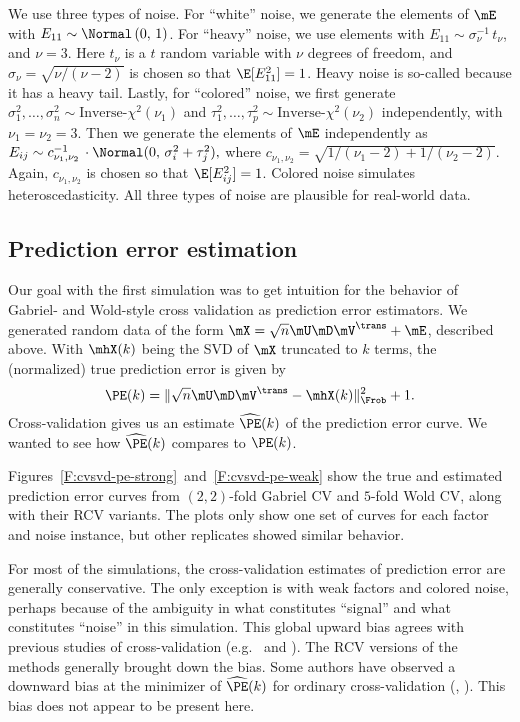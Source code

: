 We use three types of noise.  For ``white'' noise, we generate the elements of $\mE$ \iid with $E_{11} \sim \Normal\left( 0, \, 1\right)$.  For ``heavy'' noise, we use \iid elements with $E_{11} \sim \sigma_\nu^{-1} \, t_\nu$, and
$\nu = 3$.  Here $t_\nu$ is a $t$ random variable with $\nu$ degrees of freedom, and $\sigma_\nu = \sqrt{\nu/(\nu-2)}$ is chosen so that 
$\E [ E_{11}^2 ] = 1$.  Heavy noise is so-called because it has a heavy tail.  Lastly, for ``colored'' noise, we first generate
$\sigma^2_1, \ldots, \sigma^2_n \sim \text{Inverse-$\chi^2$}(\nu_1)$ and
$\tau^2_1, \ldots, \tau^2_p \sim \text{Inverse-$\chi^2$}(\nu_2)$ independently, with $\nu_1 = \nu_2 = 3$.  Then we generate the elements of $\mE$ independently as
\(
    E_{ij} \sim 
        c_{\nu_1, \nu_2}^{-1} \, \cdot \Normal( 0, \, \sigma^2_i + \tau^2_j),
\)
where
\(
    c_{\nu_1, \nu_2}
        =
        \sqrt{1/(\nu_1 - 2) + 1/(\nu_2 - 2)}
\).
Again, $c_{\nu_1, \nu_2}$ is chosen so that $\E [E_{ij}^2] = 1$.  Colored 
noise simulates heteroscedasticity.  All three types of noise are plausible 
for real-world data.


\subsection{Prediction error estimation}

Our goal with the first simulation was to get intuition for the behavior of
Gabriel- and Wold-style cross validation as prediction error estimators. We
generated random data of the form $\mX = \sqrt{n} \mU \mD \mV^\trans + \mE$,
described above. With $\mhX(k)$ being the SVD of $\mX$ truncated to $k$ terms,
the (normalized) true prediction error is given by
\[ 
    \PE(k) = \| \sqrt{n} \mU \mD \mV^\trans - \mhX(k) \|_\Frob^2 + 1. 
\] 
Cross-validation gives us an estimate $\widehat{\PE}(k)$ of the prediction 
error curve.  We wanted to see how $\widehat{\PE}(k)$ compares to $\PE(k)$.

Figures~\ref{F:cvsvd-pe-strong}~and~\ref{F:cvsvd-pe-weak} show the true and
estimated prediction error curves from $(2,2)$-fold Gabriel CV and $5$-fold
Wold CV, along with their RCV variants. The plots only show one set of curves
for each factor and noise instance, but other replicates showed similar
behavior.  

For most of the simulations, the cross-validation estimates of prediction
error are generally conservative. The only exception is with weak factors and
colored noise, perhaps because of the ambiguity in what constitutes ``signal''
and what constitutes ``noise'' in this simulation. This global upward bias
agrees with previous studies of cross-validation 
(e.g.~\cite{breiman1992little} and \cite{breiman1992submodel}).  The RCV versions of the methods generally brought down the bias.  Some authors have observed a downward bias at the minimizer of $\widehat{\PE}(k)$ for ordinary cross-validation (\cite{breiman1984cart}, \cite{tibshirani2009}).  This bias does not appear to be present here.

